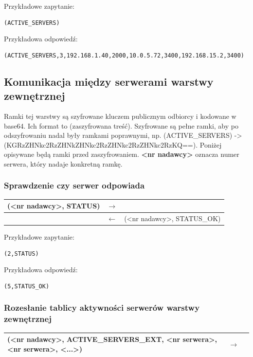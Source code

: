 Przykładowe zapytanie:
\begin{lstlisting}[style=incode]
(ACTIVE_SERVERS)
\end{lstlisting}
Przykładowa odpowiedź:
\begin{lstlisting}[style=incode]
(ACTIVE_SERVERS,3,192.168.1.40,2000,10.0.5.72,3400,192.168.15.2,3400)
\end{lstlisting}

\subsection{Komunikacja między serwerami warstwy zewnętrznej}

Ramki tej warstwy są szyfrowane kluczem publicznym odbiorcy i kodowane w base64. Ich format to (zaszyfrowana treść). Szyfrowane są pełne ramki, aby po odszyfrowaniu nadal były ramkami poprawnymi, np. (ACTIVE\_SERVERS) -> (KGRzZHNkc2RzZHNkZHNkc2RzZHNkc2RzZHNkc2RzKQ==). Poniżej opisywane będą ramki przed zaszyfrowaniem.
\textbf{<nr nadawcy>} oznacza numer serwera, który nadaje konkretną ramkę.

\subsubsection{Sprawdzenie czy serwer odpowiada}

\begin{longtable}{| p{} | p{}| p{} |} 
\hline
(<nr nadawcy>, STATUS) & $\rightarrow$ &  \\ \hline
 & $\leftarrow$ & (<nr nadawcy>, STATUS\_OK) \\ \hline
\end{longtable}

Przykładowe zapytanie:
\begin{lstlisting}[style=incode]
(2,STATUS)
\end{lstlisting}
Przykładowa odpowiedź:
\begin{lstlisting}[style=incode]
(5,STATUS_OK)
\end{lstlisting}

\subsubsection{Rozesłanie tablicy aktywności serwerów warstwy zewnętrznej}

\begin{longtable}{| p{} | p{}| p{} |} 
\hline
(<nr nadawcy>, ACTIVE\_SERVERS\_EXT, <nr serwera>, <nr serwera>, <...>) & $\rightarrow$ &  \\ \hline
\end{longtable}


